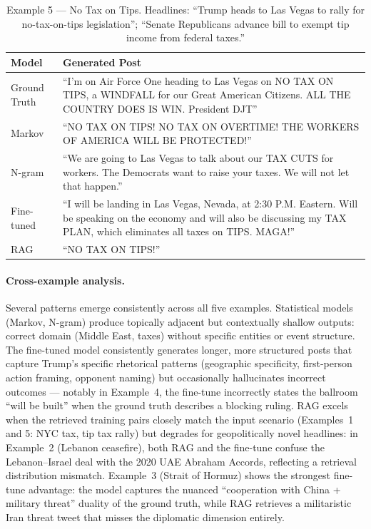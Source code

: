 \documentclass[11pt,a4paper]{article}
\begin{document}
\begin{table}[H]
\centering
\caption{Example 5 --- No Tax on Tips. Headlines: ``Trump heads to Las Vegas to rally for no-tax-on-tips legislation''; ``Senate Republicans advance bill to exempt tip income from federal taxes.''}
\label{tab:qual5}
\begin{tabular}{lp{9.5cm}}
\toprule
\textbf{Model} & \textbf{Generated Post} \\
\midrule
Ground Truth  & ``I'm on Air Force One heading to Las Vegas on NO TAX ON TIPS, a WINDFALL for our Great American Citizens. ALL THE COUNTRY DOES IS WIN. President DJT'' \\
\midrule
Markov        & ``NO TAX ON TIPS! NO TAX ON OVERTIME! THE WORKERS OF AMERICA WILL BE PROTECTED!'' \\
N-gram        & ``We are going to Las Vegas to talk about our TAX CUTS for workers. The Democrats want to raise your taxes. We will not let that happen.'' \\
Fine-tuned    & ``I will be landing in Las Vegas, Nevada, at 2:30 P.M. Eastern. Will be speaking on the economy and will also be discussing my TAX PLAN, which eliminates all taxes on TIPS. MAGA!'' \\
RAG           & ``NO TAX ON TIPS!'' \\
\bottomrule
\end{tabular}
\end{table}

\paragraph{Cross-example analysis.}
Several patterns emerge consistently across all five examples. Statistical models (Markov, N-gram) produce topically adjacent but contextually shallow outputs: correct domain (Middle East, taxes) without specific entities or event structure. The fine-tuned model consistently generates longer, more structured posts that capture Trump's specific rhetorical patterns (geographic specificity, first-person action framing, opponent naming) but occasionally hallucinates incorrect outcomes --- notably in Example~4, the fine-tune incorrectly states the ballroom ``will be built'' when the ground truth describes a blocking ruling. RAG excels when the retrieved training pairs closely match the input scenario (Examples~1 and 5: NYC tax, tip tax rally) but degrades for geopolitically novel headlines: in Example~2 (Lebanon ceasefire), both RAG and the fine-tune confuse the Lebanon--Israel deal with the 2020 UAE Abraham Accords, reflecting a retrieval distribution mismatch. Example~3 (Strait of Hormuz) shows the strongest fine-tune advantage: the model captures the nuanced ``cooperation with China + military threat'' duality of the ground truth, while RAG retrieves a militaristic Iran threat tweet that misses the diplomatic dimension entirely.
\end{document}
